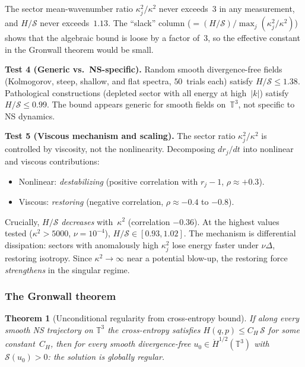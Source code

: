 \documentclass[11pt]{article}
\newtheorem{theorem}{Theorem}[section]
\theoremstyle{definition}
\newcommand{\T}{\mathbb{T}}
\newcommand{\Hdot}[1]{\dot{H}^{#1}}
\newcommand{\cS}{\mathcal{S}}
\begin{document}
The sector mean-wavenumber ratio $\kappa_j^2/\kappa^2$
never exceeds~$3$ in any measurement, and $H/\cS$ never
exceeds~$1.13$.  The ``slack'' column
($= (H/\cS)/\max_j(\kappa_j^2/\kappa^2)$) shows that the
algebraic bound is loose by a factor of~$3$, so the
effective constant in the Gronwall theorem would be small.

\noindent\textbf{Test 4 (Generic vs.\ NS-specific).}
Random smooth divergence-free fields (Kolmogorov, steep,
shallow, and flat spectra, $50$~trials each) satisfy
$H/\cS \leq 1.38$.  Pathological constructions
(depleted sector with all energy at high~$|k|$) satisfy
$H/\cS \leq 0.99$.  The bound appears generic for
smooth fields on~$\T^3$, not specific to NS dynamics.

\noindent\textbf{Test 5 (Viscous mechanism and scaling).}
The sector ratio $\kappa_j^2/\kappa^2$ is controlled by
viscosity, not the nonlinearity.  Decomposing
$dr_j/dt$ into nonlinear and viscous contributions:
\begin{itemize}
\item Nonlinear: \emph{destabilizing}
(positive correlation with $r_j - 1$,
$\rho \approx +0.3$).
\item Viscous: \emph{restoring}
(negative correlation, $\rho \approx -0.4$ to $-0.8$).
\end{itemize}
Crucially, $H/\cS$ \emph{decreases} with~$\kappa^2$
(correlation $-0.36$).  At the highest values tested
($\kappa^2 > 5000$, $\nu = 10^{-4}$), $H/\cS \in [0.93, 1.02]$.
The mechanism is differential dissipation: sectors with
anomalously high $\kappa_j^2$ lose energy faster under
$\nu\Delta$, restoring isotropy.  Since $\kappa^2 \to \infty$
near a potential blow-up, the restoring force
\emph{strengthens} in the singular regime.


\subsubsection{The Gronwall theorem}

\begin{theorem}[Unconditional regularity from cross-entropy bound]
\label{thm:gronwall}
If along every smooth NS trajectory on $\T^3$ the
cross-entropy satisfies $H(q,p) \leq C_H\,\cS$
for some constant~$C_H$, then for every smooth
divergence-free $u_0 \in \Hdot{1/2}(\T^3)$ with
$\cS(u_0) > 0$:
the solution is globally regular.
\end{theorem}
\end{document}
